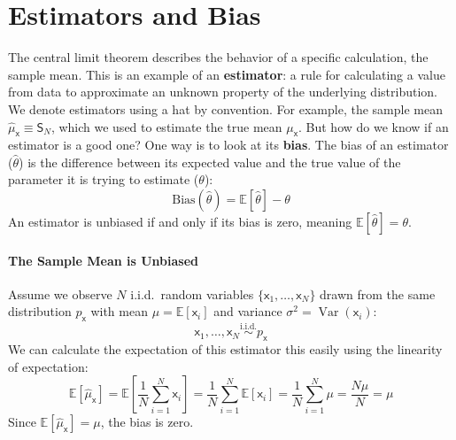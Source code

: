 \section{Estimators and Bias}
The central limit theorem describes the behavior of a specific calculation, the sample mean. This is an example of an \textbf{estimator}: a rule for calculating a value from data to approximate an unknown property of the underlying distribution. We denote estimators using a hat by convention. For example, the sample mean $\hat{\mu}_{\mathsf{x}} \equiv \mathsf{S}_N$, which we used to estimate the true mean $\mu_{\mathsf{x}}$. But how do we know if an estimator is a good one? One way is to look at its \textbf{bias}. The bias of an estimator ($\hat{\theta}$) is the difference between its expected value and the true value of the parameter it is trying to estimate ($\theta$):
\begin{equation}
    \text{Bias}(\hat{\theta}) = \mathbb{E}[\hat{\theta}] - \theta
\end{equation}
An estimator is unbiased if and only if its bias is zero, meaning $\mathbb{E}[\hat{\theta}] = \theta$. 

\paragraph*{The Sample Mean is Unbiased}
Assume we observe $N$ i.i.d.\ random variables $\{\mathsf{x}_1, \dots, \mathsf{x}_N\}$ drawn from the same distribution $p_\mathsf{x}$ with mean $\mu=\mathbb{E}[\mathsf{x}_i]$ and variance $\sigma^2=\operatorname{Var}(\mathsf{x}_i)$:
\begin{equation}
\mathsf{x}_1,\ldots,\mathsf{x}_N \stackrel{\text{i.i.d.}}{\sim} p_\mathsf{x}
\label{eq:iid-samples}
\end{equation}
We can calculate the expectation of this estimator this easily using the linearity of expectation:
\begin{equation}
    \mathbb{E}[\hat{\mu}_{\mathsf{x}}] = \mathbb{E}\left[\frac{1}{N}\sum_{i=1}^N \mathsf{x}_i\right] = \frac{1}{N}\sum_{i=1}^N \mathbb{E}[\mathsf{x}_i] = \frac{1}{N}\sum_{i=1}^N \mu = \frac{N\mu}{N} = \mu
\end{equation}
Since $\mathbb{E}[\hat{\mu}_{\mathsf{x}}] = \mu$, the bias is zero.

